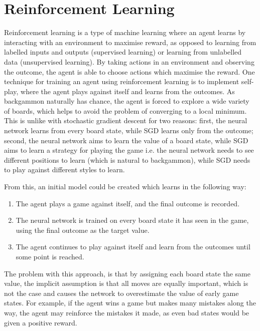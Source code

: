 \section{Reinforcement Learning}

Reinforcement learning is a type of machine learning where an agent learns by interacting with an environment to maximise reward, as opposed to learning from labelled inputs and outputs (supervised learning) or learning from unlabelled data (unsupervised learning). By taking actions in an environment and observing the outcome, the agent is able to choose actions which maximise the reward.  
One technique for training an agent using reinforcement learning is to implement self-play, where the agent plays against itself and learns from the outcomes. 
As backgammon naturally has chance, the agent is forced to explore a wide variety of boards, which helps to avoid the problem of converging to a local minimum. 
This is unlike with stochastic gradient descent for two reasons: first, the neural network learns from every board state, while SGD learns only from the outcome; second, the neural network aims to learn the value of a board state, while SGD aims to learn a strategy for playing the game i.e. the neural network needs to see different positions to learn (which is natural to backgammon), while SGD needs to play against different styles to learn. 

From this, an initial model could be created which learns in the following way:
\begin{enumerate}
    \item The agent plays a game against itself, and the final outcome is recorded.
    \item The neural network is trained on every board state it has seen in the game, using the final outcome as the target value.
    \item The agent continues to play against itself and learn from the outcomes until some point is reached.
\end{enumerate}

The problem with this approach, is that by assigning each board state the same value, the implicit assumption is that all moves are equally important, which is not the case and causes the network to overestimate the value of early game states.
For example, if the agent wins a game but makes many mistakes along the way, the agent may reinforce the mistakes it made, as even bad states would be given a positive reward. 

